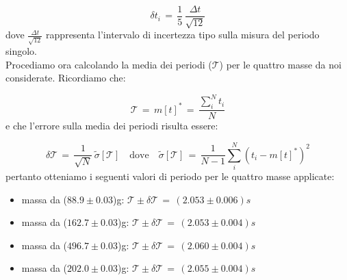 \begin{equation*}
	\delta t_i \,=\, \frac{1}{5} \, \frac{\Delta t}{\sqrt{12}}
\end{equation*}
%
dove $\frac{\Delta t}{\sqrt{12}}$ rappresenta l'intervalo di incertezza tipo sulla misura del periodo singolo.\\
Procediamo ora calcolando la media dei periodi ($\mathcal{T}$) per le quattro masse da noi considerate. Ricordiamo che:

\begin{equation*}
	\mathcal{T} \,=\, m[t]^* \,=\, \frac{\sum_{i}^{N} t_i}{N}
\end{equation*}
%
e che l'errore sulla media dei periodi risulta essere:

\begin{equation*}
	\delta \mathcal{T} \,=\, \frac{1}{\sqrt{N}} \, \tilde\sigma[\mathcal{T}] \quad \text{dove} \quad \tilde\sigma[\mathcal{T}] \,=\, \frac{1}{N-1} \sum_{i}^{N} (t_i - m[t]^*)^2
\end{equation*}
%
pertanto otteniamo i seguenti valori di periodo per le quattro masse applicate:
\begin{itemize}
	\item{ massa da ($88.9 \pm 0.03$)g: $\mathcal{T} \pm \delta\mathcal{T} \,=\, (2.053 \pm 0.006) s $}
	\item{ massa da ($162.7 \pm 0.03$)g: $\mathcal{T} \pm \delta\mathcal{T} \,=\, (2.053 \pm 0.004) s $}
	\item{ massa da ($496.7 \pm 0.03$)g: $\mathcal{T} \pm \delta\mathcal{T} \,=\, (2.060 \pm 0.004) s $}
	\item{ massa da ($202.0 \pm 0.03$)g: $\mathcal{T} \pm \delta\mathcal{T} \,=\, (2.055 \pm 0.004) s $}
\end{itemize}



